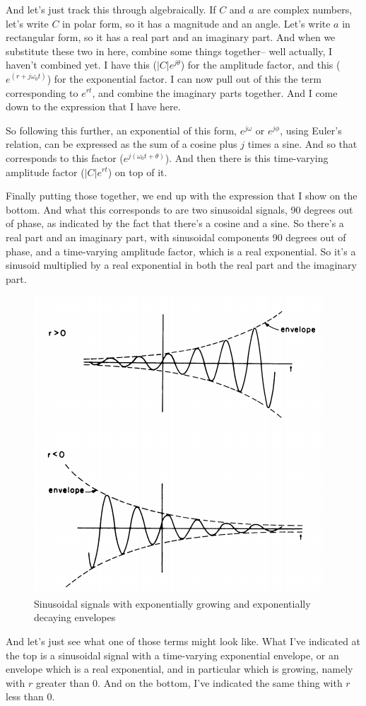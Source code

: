 \documentclass[fleqn,10pt]{olplainarticle}
\theoremstyle{definition}
\theoremstyle{remark}
\begin{document}
And let's just track this through algebraically. If $C$ and $a$ are complex numbers, let's write $C$ in polar form, so it has a magnitude and an angle. Let's write $a$ in rectangular form, so it has a real part and an imaginary part. And when we substitute these two in here, combine some things together-- well actually, I haven't combined yet. I have this ($|C|e^{j\theta}$) for the amplitude factor, and this ($e^{(r+j\omega_0t)}$) for the exponential factor. I can now pull out of this the term corresponding to $e^{rt}$, and combine the imaginary parts together. And I come down to the expression that I have here.

So following this further, an exponential of this form, $e^{j\omega}$ or $e^{j\phi}$, using Euler's relation, can be expressed as the sum of a cosine plus $j$ times a sine. And so that corresponds to this factor ($e^{j(\omega_0t + \theta)}$). And then there is this time-varying amplitude factor ($|C|e^{rt}$) on top of it.

Finally putting those together, we end up with the expression that I show on the bottom. And what this corresponds to are two sinusoidal signals, 90 degrees out of phase, as indicated by the fact that there's a cosine and a sine. So there's a real part and an imaginary part, with sinusoidal components 90 degrees out of phase, and a time-varying amplitude factor, which is a real exponential. So it's a sinusoid multiplied by a real exponential in both the real part and the imaginary part.

\begin{figure}[ht]
	\centering
	\includegraphics[width=0.4\linewidth]{images/signals_18.png}
	\caption{Sinusoidal signals with exponentially growing and exponentially decaying envelopes}
	\label{fig:signals_18}
\end{figure}

And let's just see what one of those terms might look like. What I've indicated at the top is a sinusoidal signal with a time-varying exponential envelope, or an envelope which is a real exponential, and in particular which is growing, namely with $r$ greater than 0. And on the bottom, I've indicated the same thing with $r$ less than 0.
\end{document}
